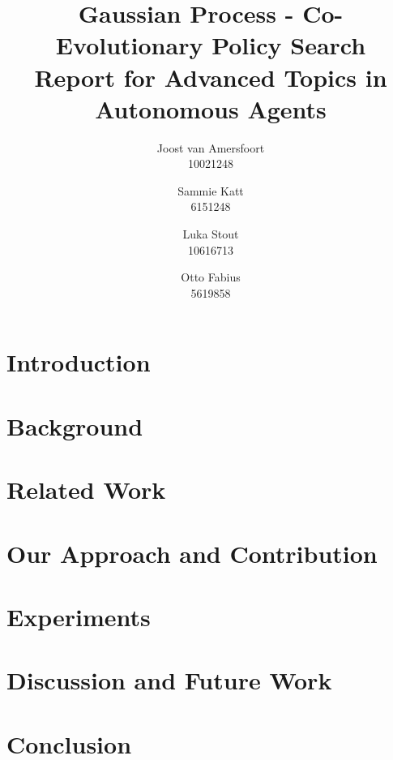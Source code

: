 \documentclass{article}
\title{Gaussian Process - Co-Evolutionary Policy Search \\ {\large Report for Advanced Topics in Autonomous Agents}}
\author{Joost van Amersfoort \\ 10021248 \and Sammie Katt \\ 6151248 \and Luka Stout \\ 10616713 \and Otto Fabius \\ 5619858}
\begin{document}
\maketitle
\tableofcontents
\newpage

\section{Introduction}


\section{Background}\label{background}


\section{Related Work}\label{related}


\section{Our Approach and Contribution}\label{contrib}


\section{Experiments}\label{experiments}


\section{Discussion and Future Work}\label{discussion}


\section{Conclusion}\label{conclusion}


\pagebreak 
\nocite{*}


\end{document}
